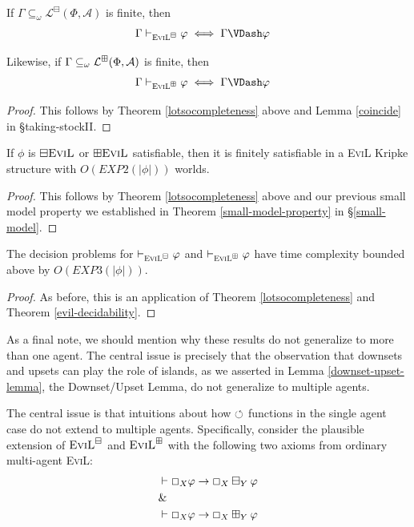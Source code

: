 \begin{lemma} \ \\
If $\Gamma\subseteq_\omega \mathcal{L}^\boxminus(\Phi,\mathcal{A})$ is
finite, then 
\begin{align*}
\Gamma \vdash_{\textsc{EviL}^\BM} \phi & \iff \Gamma
\VDash \phi
\end{align*}

Likewise, if $\Gamma\subseteq_\omega \mathcal{L}^\boxplus(\Phi,\mathcal{A})$ is finite, then 
\begin{align*}
\Gamma \vdash_{\textsc{EviL}^\BP} \phi & \iff \Gamma
\VDash \phi
\end{align*}
\end{lemma}
\begin{proof}
This follows by Theorem \ref{lotsocompleteness} above and Lemma \ref{coincide} in \S{taking-stockII}.
\end{proof}

\begin{theorem}
If $\phi$ is ${\boxminus\textsc{EviL}}$ or ${\boxplus\textsc{EviL}}$ satisfiable,
 then it is finitely satisfiable in a \textsc{EviL} Kripke structure
 with $O(EXP2(|\phi|))$ worlds.
\end{theorem}
\begin{proof}
This follows by Theorem \ref{lotsocompleteness} above and our previous
small model property we established in Theorem
\ref{small-model-property} in \S\ref{small-model}.
\end{proof}

\begin{theorem}[$\BM/\BP$ Decidability]
The decision problems for $\vdash_{\textsc{EviL}^\boxminus} \varphi$ and
$\vdash_{\textsc{EviL}^\boxplus} \varphi$ have time complexity bounded
above by $O(EXP3(|\phi|))$.
\end{theorem}
\begin{proof}
As before, this is an application of Theorem \ref{lotsocompleteness} 
and Theorem \ref{evil-decidability}.
\end{proof}

As a final note, we should mention why these results do not generalize
to more than one agent.  The central issue is precisely that the
observation that downsets and upsets can play the role of islands, as
we asserted in Lemma \ref{downset-upset-lemma}, the Downset/Upset
Lemma, do not generalize to multiple agents.   

The central issue is that intuitions about how $\circlearrowleft$ functions in the
single agent case do not extend to multiple agents. Specifically,
consider the plausible extension of $\textsc{EviL}^\boxminus$ and $\textsc{EviL}^\boxplus$
with the following two axioms from ordinary multi-agent \textsc{EviL}:
\begin{eqnarray*} 
& \vdash \Box_X \varphi \to \Box_X\boxminus_Y\varphi \\
& \& \\
& \vdash \Box_X \varphi \to \Box_X\boxplus_Y\varphi 
\end{eqnarray*}

